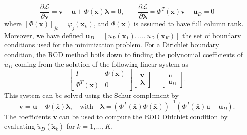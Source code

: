\documentclass{article}
\renewcommand{\phi}{\varphi}
\begin{document}
%
\begin{equation}
\frac{\partial \mathcal{L}}{\partial \boldsymbol{v}} = \boldsymbol{v} - \boldsymbol{u} + \Phi(\bar{\boldsymbol{x}}) \boldsymbol{\lambda}  = 0, \qquad \frac{\partial \mathcal{L}}{\partial \boldsymbol{\lambda}} = \Phi^T(\bar{\boldsymbol{x}})\boldsymbol{v}  - \boldsymbol{u}_D = 0
\end{equation}
%
where $[\Phi(\bar{\boldsymbol{x}})]_{j k} = \phi_j(\bar{\boldsymbol{x}}_k)$, and $\Phi(\bar{\boldsymbol{x}})$ is assumed to have full column rank. Moreover, we have defined $\boldsymbol{u}_D=[u_D(\bar{\boldsymbol{x}}_1),\ldots,u_D(\bar{\boldsymbol{x}}_K)]$ the set of boundary conditions used for the minimization problem.
For a Dirichlet boundary condition, the ROD method boils down to finding the polynomial coefficients of $\tilde u_D$ coming from the solution of the following linear system as
%
\begin{equation}\label{eq:RODE2Dsystem}
\begin{bmatrix} I & \Phi(\bar{\boldsymbol{x}}) \\ \Phi^T(\bar{\boldsymbol{x}}) & 0 \end{bmatrix} \begin{bmatrix}\boldsymbol{v} \\ \boldsymbol{\lambda} \end{bmatrix} = \begin{bmatrix} \boldsymbol{u} \\ \boldsymbol{u}_D \end{bmatrix}.
\end{equation}
This system can be solved using the Schur complement by
%
\begin{equation}
    \boldsymbol{v} = \boldsymbol{u} - \Phi(\bar{\boldsymbol{x}}) \boldsymbol{\lambda}, \quad \text{with} \quad  \boldsymbol{\lambda} = (\Phi^T(\bar{\boldsymbol{x}})\Phi(\bar{\boldsymbol{x}}))^{-1}(\Phi^T(\bar{\boldsymbol{x}})\boldsymbol{u}  - \boldsymbol{u}_D).
\end{equation}
%
The coefficients $\boldsymbol{v}$ can be used to compute the ROD Dirichlet condition by evaluating $\tilde u_D(\tilde{\boldsymbol{x}}_k)$ for $k=1,\ldots,K$.
\end{document}
